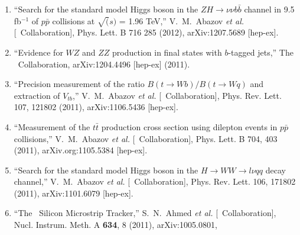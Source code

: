 \begin{enumerate}
\item ``Search for the standard model Higgs boson in the $ZH\to\nu\nu b{\bar b}$ channel in 9.5 fb$^{-1}$ of $p{\bar p}$ collisions at $\sqrt(s)$ = 1.96 TeV,'' 
V.~M.~Abazov {\it et al.}  [\dzero\ Collaboration],
Phys. Lett. B 716 285 (2012),
 arXiv:1207.5689 [hep-ex].

\item ``Evidence for $WZ$ and $ZZ$ production in final states with $b$-tagged jets,''
The \dzero\ Collaboration,
arXiv:1204.4496 [hep-ex] (2011).



\item ``Precision measurement of the ratio $B(t\to Wb)/B(t\to Wq)$ and
extraction of $V_{tb}$,''
V.~M.~Abazov {\it et al.}  [\dzero\ Collaboration],
Phys. Rev. Lett. 107, 121802 (2011),
arXiv:1106.5436 [hep-ex].

\item ``Measurement of the $t{\bar t}$ production cross section using 
dilepton events in $p{\bar p}$ collisions,''
V.~M.~Abazov {\it et al.}  [\dzero\ Collaboration],
Phys. Lett. B 704, 403 (2011),   
arXiv.org:1105.5384 [hep-ex].

\item ``Search for the standard model Higgs boson in the $H\to WW\to l\nu qq$ decay channel,''
V.~M.~Abazov {\it et al.}  [\dzero\ Collaboration],
Phys. Rev. Lett. 106, 171802 (2011),
arXiv:1101.6079 [hep-ex].


\item%
``The \dzero\ Silicon Microstrip Tracker,''
    S.~N.~Ahmed {\it et al.} [\dzero\ Collaboration],
    Nucl. Instrum. Meth. A {\bf 634}, 8 (2011),   arXiv:1005.0801,


\end{enumerate}
